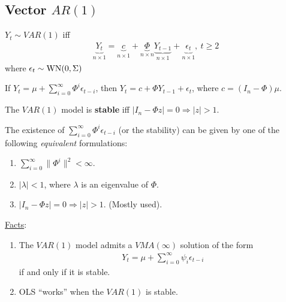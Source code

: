\documentclass[11pt]{elegantbook}
\begin{document}
\subsection{Vector $AR(1)$}
\begin{definition}[Vector $AR(1)$]
    $Y_t\sim VAR(1)$ iff
    \begin{equation}
        \begin{aligned}
            \underbrace{Y_t}_{n\times 1}=\underbrace{c}_{n\times 1}+\underbrace{\Phi}_{n\times n} \underbrace{Y_{t-1}}_{n\times 1} + \underbrace{\epsilon_t}_{n\times 1},\ t\geq 2
        \end{aligned}
        \nonumber
    \end{equation}
    where $\epsilon_t\sim \textnormal{WN}(0,\Sigma)$
\end{definition}

\begin{lemma}
    If $Y_t=\mu+\sum_{i=0}^\infty\Phi^i\epsilon_{t-i}$, then $Y_t=c+\Phi Y_{t-1} + \epsilon_t$, where $c=(I_n-\Phi)\mu$.
\end{lemma}


\begin{definition}
    The $VAR(1)$ model is \textbf{stable} iff $|I_n-\Phi z|=0 \Rightarrow |z|>1$.
\end{definition}
The existence of $\sum_{i=0}^\infty\Phi^i\epsilon_{t-i}$ (or the stability) can be given by one of the following \textit{equivalent} formulations:
\begin{enumerate}
    \item $\sum_{i=0}^\infty\|\Phi^i\|^2<\infty$.
    \item $|\lambda|<1$, where $\lambda$ is an eigenvalue of $\Phi$.
    \item $|I_n-\Phi z|=0 \Rightarrow |z|>1$. (Mostly used).
\end{enumerate}

\underline{Facts}:
\begin{enumerate}
    \item The $VAR(1)$ model admits a $VMA(\infty)$ solution of the form
    \begin{equation}
        \begin{aligned}
            Y_t=\mu+\sum_{i=0}^\infty\psi_i\epsilon_{t-i}
        \end{aligned}
        \nonumber
    \end{equation}
    if and only if it is stable.
    \item OLS ``works'' when the $VAR(1)$ is stable.
\end{enumerate}
\end{document}
